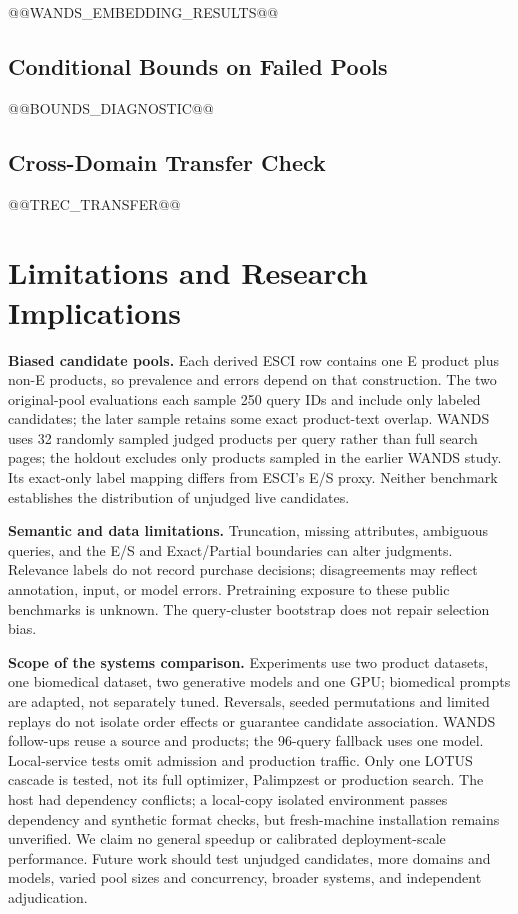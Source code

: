 \documentclass[conference]{IEEEtran}
\begin{document}
@@WANDS_EMBEDDING_RESULTS@@

\subsection{Conditional Bounds on Failed Pools}
@@BOUNDS_DIAGNOSTIC@@

\subsection{Cross-Domain Transfer Check}
@@TREC_TRANSFER@@

\section{Limitations and Research Implications}
\textbf{Biased candidate pools.} Each derived ESCI row contains one E product plus non-E products, so prevalence and errors depend on that construction. The two original-pool evaluations each sample 250 query IDs and include only labeled candidates; the later sample retains some exact product-text overlap. WANDS uses 32 randomly sampled judged products per query rather than full search pages; the holdout excludes only products sampled in the earlier WANDS study. Its exact-only label mapping differs from ESCI's E/S proxy. Neither benchmark establishes the distribution of unjudged live candidates.

\textbf{Semantic and data limitations.} Truncation, missing attributes, ambiguous queries, and the E/S and Exact/Partial boundaries can alter judgments. Relevance labels do not record purchase decisions; disagreements may reflect annotation, input, or model errors. Pretraining exposure to these public benchmarks is unknown. The query-cluster bootstrap does not repair selection bias.

\textbf{Scope of the systems comparison.} Experiments use two product datasets, one biomedical dataset, two generative models and one GPU; biomedical prompts are adapted, not separately tuned. Reversals, seeded permutations and limited replays do not isolate order effects or guarantee candidate association. WANDS follow-ups reuse a source and products; the 96-query fallback uses one model. Local-service tests omit admission and production traffic. Only one LOTUS cascade is tested, not its full optimizer, Palimpzest or production search. The host had dependency conflicts; a local-copy isolated environment passes dependency and synthetic format checks, but fresh-machine installation remains unverified. We claim no general speedup or calibrated deployment-scale performance. Future work should test unjudged candidates, more domains and models, varied pool sizes and concurrency, broader systems, and independent adjudication.
\end{document}
